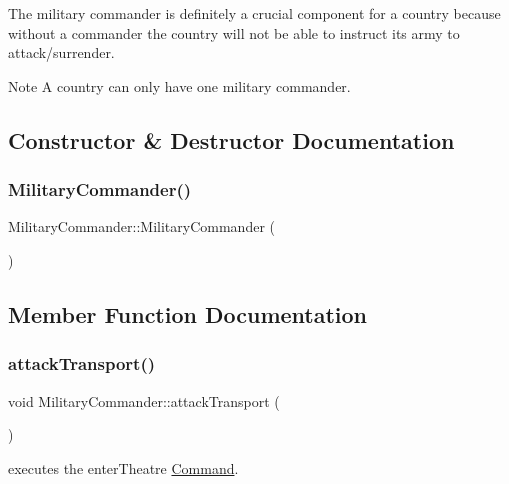 The military commander is definitely a crucial component for a country because without a commander the country will not be able to instruct its army to attack/surrender.

\begin{DoxyNote}{Note}
A country can only have one military commander. 
\end{DoxyNote}


\subsection{Constructor \& Destructor Documentation}
\mbox{\label{class_military_commander_aa787892a0f992455849804cf7ee939da}} 
\subsubsection{\texorpdfstring{MilitaryCommander()}{MilitaryCommander()}}
{\footnotesize\ttfamily Military\+Commander\+::\+Military\+Commander (\begin{DoxyParamCaption}{ }\end{DoxyParamCaption})}



\subsection{Member Function Documentation}
\mbox{\label{class_military_commander_a7f2df2a43dc6fe5bfdd03c6471278fc3}} 
\subsubsection{\texorpdfstring{attackTransport()}{attackTransport()}}
{\footnotesize\ttfamily void Military\+Commander\+::attack\+Transport (\begin{DoxyParamCaption}{ }\end{DoxyParamCaption})}



executes the enter\+Theatre \mbox{\hyperlink{class_command}{Command}}. 


